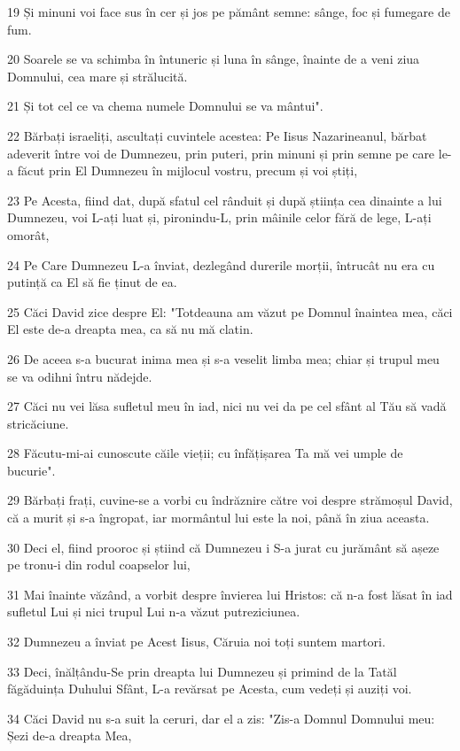 \par 19 Și minuni voi face sus în cer și jos pe pământ semne: sânge, foc și fumegare de fum.
\par 20 Soarele se va schimba în întuneric și luna în sânge, înainte de a veni ziua Domnului, cea mare și strălucită.
\par 21 Și tot cel ce va chema numele Domnului se va mântui".
\par 22 Bărbați israeliți, ascultați cuvintele acestea: Pe Iisus Nazarineanul, bărbat adeverit între voi de Dumnezeu, prin puteri, prin minuni și prin semne pe care le-a făcut prin El Dumnezeu în mijlocul vostru, precum și voi știți,
\par 23 Pe Acesta, fiind dat, după sfatul cel rânduit și după știința cea dinainte a lui Dumnezeu, voi L-ați luat și, pironindu-L, prin mâinile celor fără de lege, L-ați omorât,
\par 24 Pe Care Dumnezeu L-a înviat, dezlegând durerile morții, întrucât nu era cu putință ca El să fie ținut de ea.
\par 25 Căci David zice despre El: "Totdeauna am văzut pe Domnul înaintea mea, căci El este de-a dreapta mea, ca să nu mă clatin.
\par 26 De aceea s-a bucurat inima mea și s-a veselit limba mea; chiar și trupul meu se va odihni întru nădejde.
\par 27 Căci nu vei lăsa sufletul meu în iad, nici nu vei da pe cel sfânt al Tău să vadă stricăciune.
\par 28 Făcutu-mi-ai cunoscute căile vieții; cu înfățișarea Ta mă vei umple de bucurie".
\par 29 Bărbați frați, cuvine-se a vorbi cu îndrăznire către voi despre strămoșul David, că a murit și s-a îngropat, iar mormântul lui este la noi, până în ziua aceasta.
\par 30 Deci el, fiind prooroc și știind că Dumnezeu i S-a jurat cu jurământ să așeze pe tronu-i din rodul coapselor lui,
\par 31 Mai înainte văzând, a vorbit despre învierea lui Hristos: că n-a fost lăsat în iad sufletul Lui și nici trupul Lui n-a văzut putreziciunea.
\par 32 Dumnezeu a înviat pe Acest Iisus, Căruia noi toți suntem martori.
\par 33 Deci, înălțându-Se prin dreapta lui Dumnezeu și primind de la Tatăl făgăduința Duhului Sfânt, L-a revărsat pe Acesta, cum vedeți și auziți voi.
\par 34 Căci David nu s-a suit la ceruri, dar el a zis: "Zis-a Domnul Domnului meu: Șezi de-a dreapta Mea,

